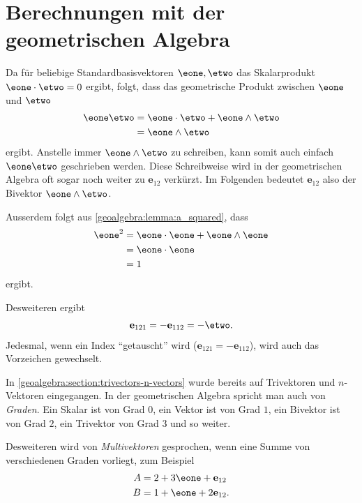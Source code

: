 \newcommand{\eot}{\mathbf{e}_{12}}
\section{Berechnungen mit der geometrischen Algebra}
Da für beliebige Standardbasisvektoren $\eone, \etwo$ das Skalarprodukt $\eone \cdot \etwo = 0$ ergibt,
folgt, dass das geometrische Produkt zwischen $\eone$ und $\etwo$
\begin{equation}
  \begin{aligned}
  \eone \etwo &= \eone \cdot \etwo + \eone \wedge \etwo \\
  &= \eone \wedge \etwo
  \end{aligned}
\end{equation}
ergibt.
Anstelle immer $\eone \wedge \etwo$ zu schreiben, kann somit auch einfach $\eone \etwo$ geschrieben werden.
Diese Schreibweise wird in der geometrischen Algebra oft sogar noch weiter zu $\eot$ verkürzt. Im Folgenden bedeutet
$\eot$ also der Bivektor $\eone \wedge \etwo$.

Ausserdem folgt aus \eqref{geoalgebra:lemma:a_squared}, dass
\begin{equation}
  \begin{aligned}
  \eone^2 &= \eone \cdot \eone + \eone \wedge \eone \\
  &= \eone \cdot \eone \\
  &= 1
  \end{aligned}
\end{equation}
ergibt.

Desweiteren ergibt 
\begin{equation}
  \begin{aligned}
  \mathbf{e}_{121} = -\mathbf{e}_{112} = -\etwo.
  \end{aligned}
\end{equation}
Jedesmal, wenn ein Index ``getauscht'' wird ($\mathbf{e}_{121} = -\mathbf{e}_{112}$), wird auch das Vorzeichen
gewechselt.

In \autoref{geoalgebra:section:trivectors-n-vectors} wurde bereits auf Trivektoren und $n$-Vektoren eingegangen. 
In der geometrischen Algebra
spricht man auch von \emph{Graden}. Ein Skalar ist von
Grad $0$, ein Vektor ist von Grad $1$, ein Bivektor ist von Grad $2$, ein Trivektor von Grad $3$ und so weiter.

Desweiteren wird von \emph{Multivektoren} gesprochen, wenn eine Summe von verschiedenen Graden vorliegt, zum Beispiel
\begin{align}
A &= 2 + 3 \eone + \eot \\
B &= 1 + \eone + 2 \eot.
\end{align}

